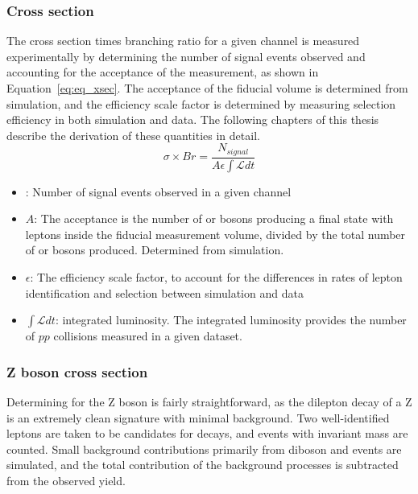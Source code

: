 \subsubsection{Cross section}
The cross section times branching ratio for a given channel is measured experimentally by determining the number of signal events observed and accounting for the acceptance of the measurement, as shown in Equation~\ref{eq:eq_xsec}. The acceptance of the fiducial volume is determined from simulation, and the efficiency scale factor is determined by measuring selection efficiency in both simulation and data. The following chapters of this thesis describe the derivation of these quantities in detail.
\begin{equation}\label{eq:eq_xsec}
\sigma\times Br = \frac{N_{signal}}{A\epsilon \int\mathcal{L} dt}
\end{equation}
\begin{itemize}
\item \nsig: Number of signal events observed in a given channel
\item $A$: The acceptance is the number of \W or \Z bosons producing a final state with leptons inside the fiducial measurement volume, divided by the total number of \W or \Z bosons produced. Determined from simulation. 
\item $\epsilon$: The efficiency scale factor, to account for the differences in rates of lepton identification and selection between simulation and data
\item $\int\mathcal{L}dt$: integrated luminosity. The integrated luminosity provides the number of $pp$ collisions measured in a given dataset.
\end{itemize}

\subsubsection{Z boson cross section}
Determining \nsig for the Z boson is fairly straightforward, as the dilepton decay of a Z is an extremely clean signature with minimal background. Two well-identified leptons are taken to be candidates for \zll decays, and events with invariant mass \masswindow are counted. Small background contributions primarily from diboson and \ttbar events are simulated, and the total contribution of the background processes is subtracted from the observed \zll yield. 




